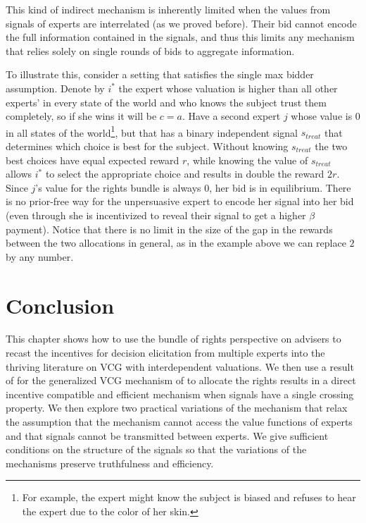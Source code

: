  
 This kind of indirect mechanism is inherently limited when the values from signals of experts are interrelated (as we proved before). Their bid cannot encode the full information contained in the signals, and thus this limits any mechanism that relies solely on single rounds of bids to aggregate information.
 
 To illustrate this, consider a setting that satisfies the single max bidder assumption.%
 Denote by $i^*$ the expert whose valuation is higher than all other experts' in every state of the world and who knows the subject trust them completely, so if she wins it will be $c=a$. Have a second expert $j$ whose value is $0$ in all states of the world\footnote{For example, the expert might know the subject is biased and refuses to hear the expert due to the color of her skin.}, but that has a binary independent signal $s_{treat}$ that determines which choice is best for the subject. Without knowing $s_{treat}$ the two best choices have equal expected reward $r$, while knowing the value of $s_{treat}$ allows $i^*$ to select the appropriate choice and results in double the reward $2r$.
 Since $j$'s value for the rights bundle is always 0, her bid is in equilibrium. 
 There is no prior-free way for the unpersuasive expert to encode her signal into her bid (even through she is incentivized to reveal their signal to get a higher $\beta$ payment). 
 Notice that there is no limit in the size of the gap in the rewards between the two allocations in general, as in the example above we can replace $2$ by any number.
 
 

\section{Conclusion}

This chapter shows how to use the bundle of rights perspective on advisers to recast the incentives for decision elicitation from multiple experts into the thriving literature on VCG with interdependent valuations.
We then use a result of \cite{roughgarden2016optimal} for the generalized VCG mechanism of \cite{maskin1992auctions} to allocate the rights results in a direct incentive compatible and efficient mechanism when signals have a single crossing property.
We then explore two practical variations of the mechanism that relax the assumption that the mechanism cannot access the value functions of experts and that signals cannot be transmitted between experts. We give sufficient conditions on the structure of the signals so that the variations of the mechanisms preserve truthfulness and efficiency.
